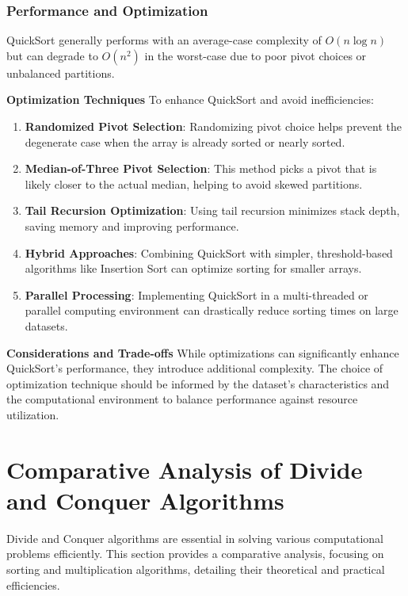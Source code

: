 \documentclass[12pt]{book} %
\begin{document}
\subsubsection{Performance and Optimization}
QuickSort generally performs with an average-case complexity of \(O(n \log n)\) but can degrade to \(O(n^2)\) in the worst-case due to poor pivot choices or unbalanced partitions.

\textbf{Optimization Techniques}
To enhance QuickSort and avoid inefficiencies:
\begin{enumerate}
    \item \textbf{Randomized Pivot Selection}: Randomizing pivot choice helps prevent the degenerate case when the array is already sorted or nearly sorted.
    \item \textbf{Median-of-Three Pivot Selection}: This method picks a pivot that is likely closer to the actual median, helping to avoid skewed partitions.
    \item \textbf{Tail Recursion Optimization}: Using tail recursion minimizes stack depth, saving memory and improving performance.
    \item \textbf{Hybrid Approaches}: Combining QuickSort with simpler, threshold-based algorithms like Insertion Sort can optimize sorting for smaller arrays.
    \item \textbf{Parallel Processing}: Implementing QuickSort in a multi-threaded or parallel computing environment can drastically reduce sorting times on large datasets.
\end{enumerate}

\textbf{Considerations and Trade-offs}
While optimizations can significantly enhance QuickSort's performance, they introduce additional complexity. The choice of optimization technique should be informed by the dataset's characteristics and the computational environment to balance performance against resource utilization.



\section{Comparative Analysis of Divide and Conquer Algorithms}

Divide and Conquer algorithms are essential in solving various computational problems efficiently. This section provides a comparative analysis, focusing on sorting and multiplication algorithms, detailing their theoretical and practical efficiencies.
\end{document}
